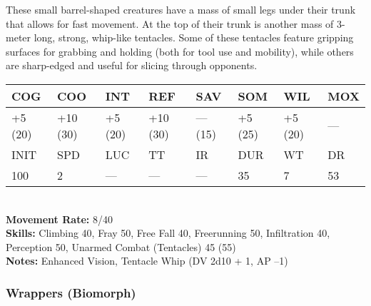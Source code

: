 These small barrel-shaped creatures have a mass of small legs under their trunk that allows for fast movement. At the top of their trunk is another mass of 3-meter long, strong, whip-like tentacles. Some of these tentacles feature gripping surfaces for grabbing and holding (both for tool use and mobility), while others are sharp-edged and useful for slicing through opponents. \\ \begin{tabular}{|l|l|l|l|l|l|l|l|} \hline

COG &COO &INT &REF &SAV &SOM &WIL &MOX \\ \hline

+5 (20) &+10 (30) &+5 (20) &+10 (30) &— (15) &+5 (25) &+5 (20) &— \\ \hline

INIT &SPD &LUC &TT &IR &DUR &WT &DR \\ \hline

100 &2 &— &— &— &35 &7 &53 \\ \hline

\end{tabular} \\ \textbf{Movement Rate:} 8/40 \\ \textbf{Skills:} Climbing 40, Fray 50, Free Fall 40, Freerunning 50, Infiltration 40, Perception 50, Unarmed Combat (Tentacles) 45 (55) \\ \textbf{Notes: }Enhanced Vision, Tentacle Whip (DV 2d10 + 1, AP –1) 

\subsubsection{Wrappers (Biomorph)} 

